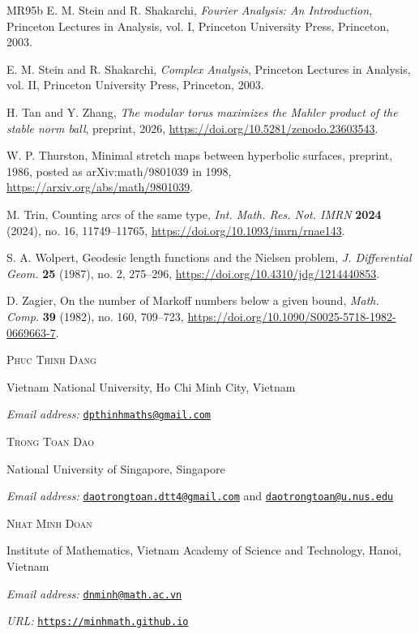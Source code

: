 \documentclass[10pt,twoside]{article}
\theoremstyle{plain}
\theoremstyle{definition}
\theoremstyle{remark}
\begin{document}
\begin{thebibliography}{MR95b}
E. M. Stein and R. Shakarchi,
\emph{Fourier Analysis: An Introduction},
Princeton Lectures in Analysis, vol. I,
Princeton University Press, Princeton, 2003.

E. M. Stein and R. Shakarchi,
\emph{Complex Analysis},
Princeton Lectures in Analysis, vol. II,
Princeton University Press, Princeton, 2003.

H. Tan and Y. Zhang,
\emph{The modular torus maximizes the Mahler product of the stable norm ball},
preprint, 2026,
\url{https://doi.org/10.5281/zenodo.23603543}.

W. P. Thurston,
Minimal stretch maps between hyperbolic surfaces,
preprint, 1986, posted as arXiv:math/9801039 in 1998,
\url{https://arxiv.org/abs/math/9801039}.

M. Trin,
Counting arcs of the same type,
\emph{Int. Math. Res. Not. IMRN} \textbf{2024} (2024),
no. 16, 11749--11765,
\url{https://doi.org/10.1093/imrn/rnae143}.

S. A. Wolpert,
Geodesic length functions and the Nielsen problem,
\emph{J. Differential Geom.} \textbf{25} (1987), no. 2, 275--296,
\url{https://doi.org/10.4310/jdg/1214440853}.

D. Zagier,
On the number of Markoff numbers below a given bound,
\emph{Math. Comp.} \textbf{39} (1982), no. 160, 709--723,
\url{https://doi.org/10.1090/S0025-5718-1982-0669663-7}.

\end{thebibliography}

\bigskip
\noindent
\begin{minipage}{\textwidth}
\small
\textsc{Phuc Thinh Dang}\par
Vietnam National University, Ho Chi Minh City, Vietnam\par
\textit{Email address:} 
\href{mailto:dpthinhmaths@gmail.com}{\nolinkurl{dpthinhmaths@gmail.com}}
\end{minipage}

\medskip
\noindent
\begin{minipage}{\textwidth}
\small
\textsc{Trong Toan Dao}\par
National University of Singapore, Singapore \par
\textit{Email address:}
\href{mailto:daotrongtoan.dtt4@gmail.com}{\nolinkurl{daotrongtoan.dtt4@gmail.com}} and \href{mailto:daotrongtoan@u.nus.edu}{\nolinkurl{daotrongtoan@u.nus.edu}}
\end{minipage}

\medskip
\noindent
\begin{minipage}{\textwidth}
\small
\textsc{Nhat Minh Doan}\par
Institute of Mathematics, Vietnam Academy of Science and Technology,
Hanoi, Vietnam\par
\textit{Email address:}
\href{mailto:dnminh@math.ac.vn}{\nolinkurl{dnminh@math.ac.vn}}\par
\textit{URL:}
\href{https://minhmath.github.io}{\nolinkurl{https://minhmath.github.io}}
\end{minipage}
\end{document}
